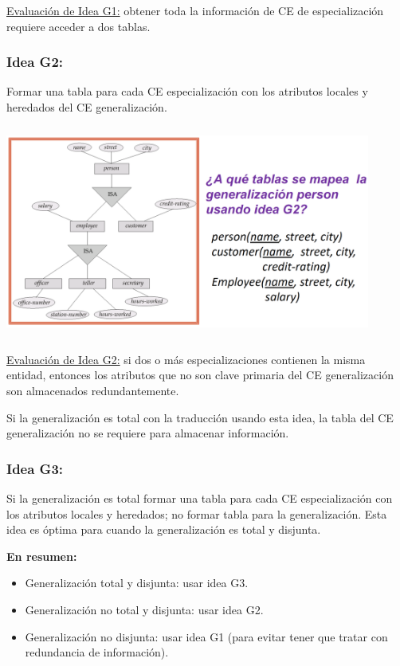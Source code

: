 \documentclass[12pt,a4paper]{report}
\begin{document}
				\underline{Evaluación de Idea G1:} obtener toda la información de CE de especialización requiere acceder a dos tablas.
			
			\subsubsection{Idea G2:} Formar una tabla para cada CE especialización con los atributos locales y heredados del CE generalización.
			
				\begin{center}
					\includegraphics[width=12cm, height=7cm]{./imagenes/g2.png}
				\end{center}
			
				\underline{Evaluación de Idea G2:} si dos o más especializaciones contienen la misma entidad, entonces los atributos que no son clave primaria del CE generalización son almacenados redundantemente.
				
				\par Si la generalización es total con la traducción usando esta idea, la tabla del CE generalización no se requiere para almacenar información.
			
			\subsubsection{Idea G3:} Si la generalización es total formar una tabla para cada CE especialización con los atributos locales y heredados; no formar tabla para la generalización. Esta idea es óptima para cuando la generalización es total y disjunta.

			\vspace{7mm}
			\textbf{En resumen:}
			\begin{itemize}
				\item Generalización total y disjunta: usar idea G3.
				\item Generalización no total y disjunta: usar idea G2.
				\item Generalización no disjunta: usar idea G1 (para evitar tener que tratar con redundancia de información).
			\end{itemize}
\end{document}
